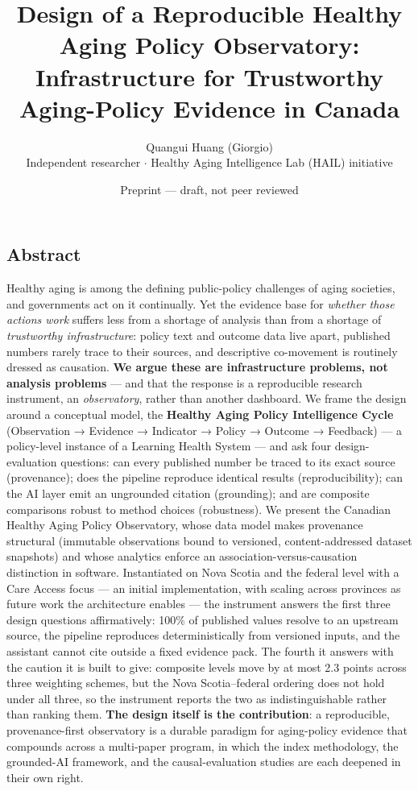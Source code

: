 \documentclass[
  11pt,
]{article}
\title{Design of a Reproducible Healthy Aging Policy Observatory:
Infrastructure for Trustworthy Aging-Policy Evidence in Canada}
\author{Quangui Huang (Giorgio)\\[3pt]{\small Independent researcher $\cdot$ Healthy Aging Intelligence Lab (HAIL) initiative}}
\date{Preprint --- draft, not peer reviewed}
\begin{document}
\maketitle

\hypertarget{abstract}{%
\subsection{Abstract}\label{abstract}}

Healthy aging is among the defining public-policy challenges of aging
societies, and governments act on it continually. Yet the evidence base
for \emph{whether those actions work} suffers less from a shortage of
analysis than from a shortage of \emph{trustworthy infrastructure}:
policy text and outcome data live apart, published numbers rarely trace
to their sources, and descriptive co-movement is routinely dressed as
causation. \textbf{We argue these are infrastructure problems, not
analysis problems} --- and that the response is a reproducible research
instrument, an \emph{observatory}, rather than another dashboard. We
frame the design around a conceptual model, the \textbf{Healthy Aging
Policy Intelligence Cycle} (Observation → Evidence → Indicator → Policy
→ Outcome → Feedback) --- a policy-level instance of a Learning Health
System --- and ask four design-evaluation questions: can every published
number be traced to its exact source (provenance); does the pipeline
reproduce identical results (reproducibility); can the AI layer emit an
ungrounded citation (grounding); and are composite comparisons robust to
method choices (robustness). We present the Canadian Healthy Aging
Policy Observatory, whose data model makes provenance structural
(immutable observations bound to versioned, content-addressed dataset
snapshots) and whose analytics enforce an association-versus-causation
distinction in software. Instantiated on Nova Scotia and the federal
level with a Care Access focus --- an initial implementation, with
scaling across provinces as future work the architecture enables --- the
instrument answers the first three design questions affirmatively: 100\%
of published values resolve to an upstream source, the pipeline
reproduces deterministically from versioned inputs, and the assistant
cannot cite outside a fixed evidence pack. The fourth it answers with
the caution it is built to give: composite levels move by at most 2.3
points across three weighting schemes, but the Nova Scotia--federal
ordering does not hold under all three, so the instrument reports the
two as indistinguishable rather than ranking them. \textbf{The design
itself is the contribution}: a reproducible, provenance-first
observatory is a durable paradigm for aging-policy evidence that
compounds across a multi-paper program, in which the index methodology,
the grounded-AI framework, and the causal-evaluation studies are each
deepened in their own right.
\end{document}
